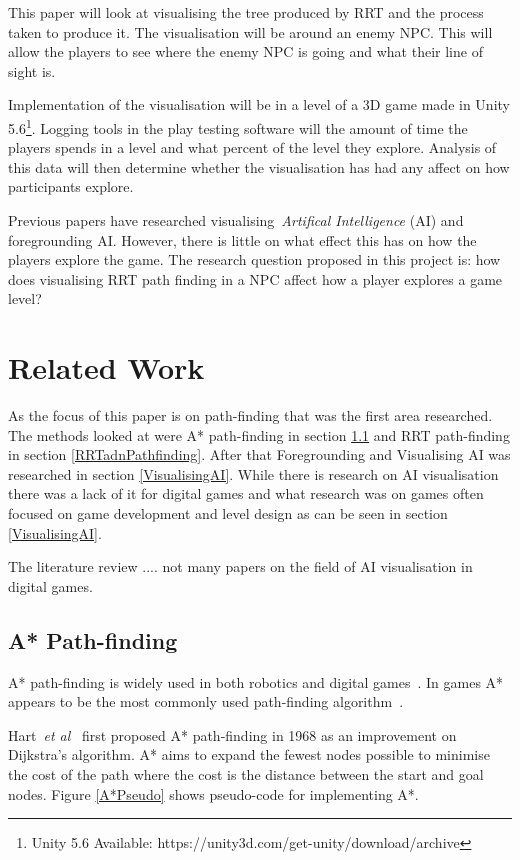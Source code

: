 \documentclass[journal]{IEEEtran}
\begin{document}
This paper will look at visualising the tree produced by RRT and the process taken to produce it. The visualisation will be around an enemy NPC. This will allow the players to see where the enemy NPC is going and what their line of sight is. 

Implementation of the visualisation will be in a level of a 3D game made in Unity 5.6\footnote[1]{Unity 5.6 Available: https://unity3d.com/get-unity/download/archive}. Logging tools in the play testing software will  the amount of time the players spends in a level and what percent of the level they explore. Analysis of this data will then determine whether the visualisation has had any affect on how participants explore.

Previous papers have researched visualising~\textit{Artifical Intelligence} (AI) and foregrounding AI. However, there is little on what effect this has on how the players explore the game.
The research question proposed in this project is: how does visualising RRT path finding in a NPC affect how a player explores a game level?

\section{Related Work} \label{RelatedWork}
As the focus of this paper is on path-finding that was the first area researched. The methods looked at were A* path-finding in section \ref{A*PF} and RRT path-finding in section \ref{RRTadnPathfinding}.  After that Foregrounding and Visualising AI was researched in section \ref{VisualisingAI}. While there is research on AI visualisation there was a lack of it for digital games and what research was on games often focused on game development and level design as can be seen in section \ref{VisualisingAI}. 

The literature review .... not many papers on the field of AI visualisation in digital games. 



\subsection{A* Path-finding} \label{A*PF}
A* path-finding is widely used in both robotics and digital games~\cite{Algfoor2015}. In games A* appears to be the most commonly used path-finding algorithm~\cite{Algfoor2015}.

Hart~\textit{et al}~\cite{Hart1968} first proposed A* path-finding in 1968 as an improvement on Dijkstra's algorithm. A* aims to expand the fewest nodes possible to minimise the cost of the path where the cost is the distance between the start and  goal nodes. Figure \ref{A*Pseudo} shows pseudo-code for implementing A*. 
\end{document}
